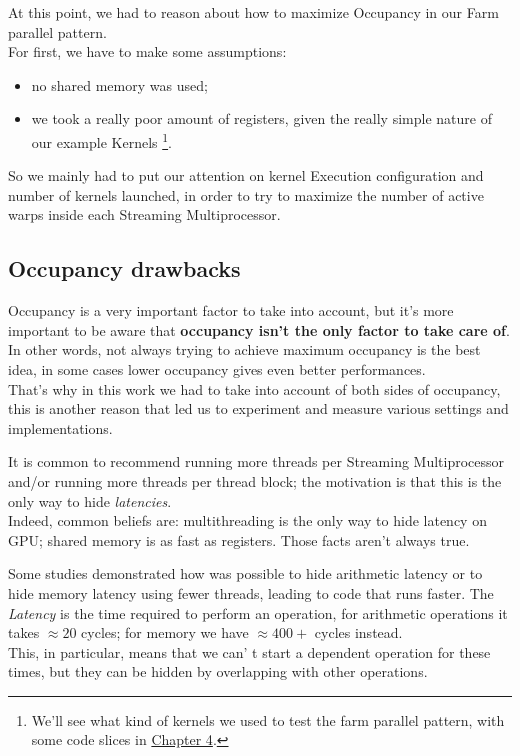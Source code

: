 At this point, we had to reason about how to maximize Occupancy in our Farm parallel pattern.\\
For first, we have to make some assumptions:
\begin{itemize}
	\item no shared memory was used;
	\item we took a really poor amount of registers, given the really simple nature of our example Kernels \footnote{We'll see what kind of kernels we used to test the farm parallel pattern, with some code slices in  \hyperref[chap:impl]{Chapter 4}.}.
\end{itemize}  
So we mainly had to put our attention on kernel Execution configuration and number of kernels launched, in order to try to maximize the number of active warps inside each Streaming Multiprocessor.

\subsection{Occupancy drawbacks}
Occupancy is a very important factor to take into account, but it's more important to be aware that \textbf{occupancy isn't the only factor to take care of}.\\
In other words, not always trying to achieve maximum occupancy is the best idea, in some cases lower occupancy gives even better performances.\\
That's why in this work we had to take into account of both sides of occupancy, this is another reason that led us to experiment and measure various settings and implementations.

It is common to recommend running more threads per Streaming Multiprocessor and/or running more threads per thread block; the motivation is that this is the only way to hide \textit{latencies}.\\
Indeed, common beliefs are: multithreading is the only way to hide latency on GPU; shared memory is as fast as registers. Those facts aren't always true.

Some studies demonstrated how was possible to hide arithmetic latency or to hide memory latency using fewer threads, leading to code that runs faster.
The \textit{Latency} is the time required to perform an operation, for arithmetic operations it takes \(\approx20\) cycles; for memory we have \(\approx400+\) cycles instead.\\
This, in particular, means that  we can' t start a dependent operation for these times, but they can be hidden by overlapping with other operations.

